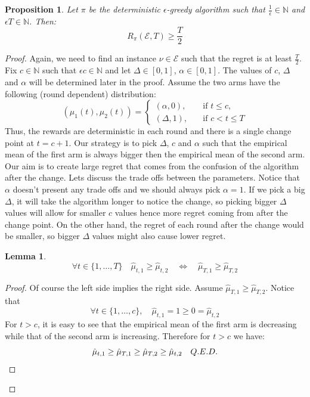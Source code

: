 \documentclass[opre,nonblindrev]{informs3} %
\newtheorem{lemma}{Lemma}
\newtheorem{proposition}{Proposition}
\newcommand{\twopartdef}[4]
{
	\left\{
		\begin{array}{ll}
			#1, & \quad\mbox{if } #2, \\
			#3, & \quad\mbox{if } #4
		\end{array}
	\right.
}
\begin{document}
\begin{proposition}
    Let $\pi$ be the deterministic $\epsilon$-greedy algorithm such that $\frac{1}{\epsilon} \in \mathbb{N}$ and $\epsilon T \in \mathbb{N}$. Then:
    \begin{equation}
        R_\pi(\mathcal{E}, T)\geq\frac{T}{2}
    \end{equation}
\end{proposition}

\begin{proof}
    Again, we need to find an instance $\nu \in \mathcal{E}$ such that the regret is at least $\frac{T}{2}$. Fix $c \in \mathbb{N}$ such that $\epsilon c \in \mathbb{N}$ and let $\Delta \in [0, 1]$, $\alpha \in [0,1]$. The values of $c$, $\Delta$ and $\alpha$ will be determined later in the proof. Assume the two arms have the following (round dependent) distribution: $$(\mu_1(t),\mu_2(t))=\twopartdef{(\alpha,0)}{t\leq c}{(\Delta,1)}{c<t\leq T}$$
    Thus, the rewards are deterministic in each round and there is a single change point at $t=c+1$.
    Our strategy is to pick $\Delta$, $c$ and $\alpha$ such that the empirical mean of the first arm is always bigger then the empirical mean of the second arm. Our aim is to create large regret that comes from the confusion of the algorithm after the change. Lets discuss the trade offs between the parameters. Notice that $\alpha$ doesn't present any trade offs and we should always pick $\alpha = 1$. If we pick a big $\Delta$, it will take the algorithm longer to notice the change, so picking bigger $\Delta$ values will allow for smaller $c$ values hence more regret coming from after the change point. On the other hand, the regret of each round after the change would be smaller, so bigger $\Delta$ values might also cause lower regret.
    \begin{lemma}
    $$\forall t \in \{1, \ldots, T\} \quad \hat{\mu}_{t,1} \geq \hat{\mu}_{t,2} \quad \iff \quad \hat{\mu}_{T,1} \geq \hat{\mu}_{T,2}$$
    \end{lemma}
    \begin{proof}
        Of course the left side implies the right side. Assume $\hat{\mu}_{T,1} \geq \hat{\mu}_{T,2}$. Notice that $$\forall t\in \{1, \ldots, c\}, \quad \hat{\mu}_{t,1}=1\geq0=\hat{\mu}_{t,2}$$ For $t>c$, it is easy to see that the empirical mean of the first arm is decreasing while that of the second arm is increasing. Therefore for $t>c$ we have:
        $$\hat{\mu}_{t,1} \geq \hat{\mu}_{T, 1} \geq \hat{\mu}_{T, 2} \geq \hat{\mu}_{t, 2} \qed$$
    \end{proof}

\end{proof}
\end{document}
